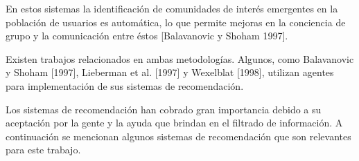 En estos sistemas la identificación de comunidades de interés emergentes en la población de usuarios es automática, lo que permite mejoras en la conciencia de grupo y la comunicación entre éstos [Balavanovic y Shoham 1997].


Existen trabajos relacionados en ambas metodologías. Algunos, como Balavanovic y Shoham [1997], Lieberman et al. [1997] y Wexelblat [1998], utilizan agentes para implementación de sus sistemas de recomendación.


Los sistemas de recomendación han cobrado gran importancia debido a su aceptación por la gente y la ayuda que brindan en el filtrado de información. A continuación se mencionan algunos sistemas de recomendación que son relevantes para este trabajo.